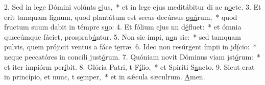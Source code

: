 2. Sed in lege Dómini volúnts \uline{e}jus,~* et in lege ejus meditábitur di ac n\uline{o}cte.
3. Et erit tamquam lignum, quod plantátum est secus decúrsus \uline{quá}rum,~* quod fructum suum dabit in témpre s\uline{u}o:
4. Et fólium ejus nn d\uline{é}fluet:~* et ómnia quæcúmque fáciet, prosprab\uline{ú}ntur.
5. Non sic ímpi, n\uline{o}n sic:~* sed tamquam pulvis, quem prójicit ventus a fáce t\uline{e}rræ.
6. Ideo non resúrgent ímpii in jd\uline{í}cio:~* neque peccatóres in concíli just\uline{ó}rum.
7. Quóniam novit Dóminus viam jst\uline{ó}rum:~* et iter impiórm per\uline{í}bit.
8. Glória Patri, t F\uline{í}lio,~* et Spiríti S\uline{a}ncto.
9. Sicut erat in princípio, et nunc, t s\uline{e}mper,~* et in sǽcula sæculrum. \uline{A}men.
